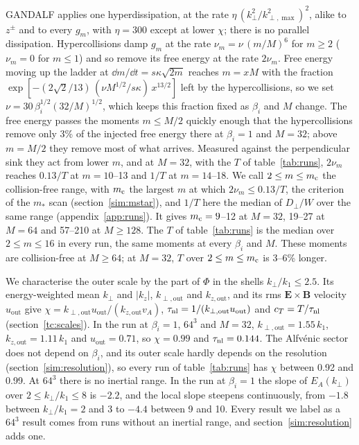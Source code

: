 GANDALF applies one hyperdissipation, at the rate $\eta\,(k_\perp^2/k_{\perp,\max}^2)^2$, alike to $z^\pm$ and to every $g_m$, with $\eta=300$ except at lower $\chi$; there is no parallel dissipation. Hypercollisions damp $g_m$ at the rate $\nu_m=\nu\,(m/M)^6$ for $m\ge2$ ($\nu_m=0$ for $m\le1$) and so remove its free energy at the rate $2\nu_m$. Free energy moving up the ladder at $\dd m/\dd t=s\kappa\sqrt{2m}$ reaches $m=xM$ with the fraction $\exp[-(2\sqrt2/13)\,(\nu M^{1/2}/s\kappa)\,x^{13/2}]$ left by the hypercollisions, so we set $\nu=30\,\beta_i^{1/2}(32/M)^{1/2}$, which keeps this fraction fixed as $\beta_i$ and $M$ change. The free energy passes the moments $m\le M/2$ quickly enough that the hypercollisions remove only 3\% of the injected free energy there at $\beta_i=1$ and $M=32$; above $m=M/2$ they remove most of what arrives. Measured against the perpendicular sink they act from lower $m$, and at $M=32$, with the $T$ of table~\ref{tab:runs}, $2\nu_m$ reaches $0.13/T$ at $m=10$--13 and $1/T$ at $m=14$--18. We call $2\le m\le m_{\rm c}$ the collision-free range, with $m_{\rm c}$ the largest $m$ at which $2\nu_m\le0.13/T$, the criterion of the $m_*$ scan (section~\ref{sim:mstar}), and $1/T$ here the median of $D_\perp/W$ over the same range (appendix~\ref{app:runs}). It gives $m_{\rm c}=9$--12 at $M=32$, 19--27 at $M=64$ and 57--210 at $M\ge128$. The $T$ of table~\ref{tab:runs} is the median over $2\le m\le16$ in every run, the same moments at every $\beta_i$ and $M$. These moments are collision-free at $M\ge64$; at $M=32$, $T$ over $2\le m\le m_{\rm c}$ is 3--6\% longer.

We characterise the outer scale by the part of $\Phi$ in the shells $k_\perp/k_1\le2.5$. Its energy-weighted mean $k_\perp$ and $|k_z|$, $k_{\perp,\mathrm{out}}$ and $k_{z,\mathrm{out}}$, and its rms $\boldsymbol E\times\boldsymbol B$ velocity $u_{\mathrm{out}}$ give $\chi=k_{\perp,\mathrm{out}}u_{\mathrm{out}}/(k_{z,\mathrm{out}}v_A)$, $\tau_{\rm nl}=1/(k_{\perp,\mathrm{out}}u_{\mathrm{out}})$ and $c_T=T/\tau_{\rm nl}$ (section~\ref{tc:scales}). In the run at $\beta_i=1$, $64^3$ and $M=32$, $k_{\perp,\mathrm{out}}=1.55\,k_1$, $k_{z,\mathrm{out}}=1.11\,k_1$ and $u_{\mathrm{out}}=0.71$, so $\chi=0.99$ and $\tau_{\rm nl}=0.144$. The Alfv\'enic sector does not depend on $\beta_i$, and its outer scale hardly depends on the resolution (section~\ref{sim:resolution}), so every run of table~\ref{tab:runs} has $\chi$ between 0.92 and 0.99. At $64^3$ there is no inertial range. In the run at $\beta_i=1$ the slope of $E_A(k_\perp)$ over $2\le k_\perp/k_1\le8$ is $-2.2$, and the local slope steepens continuously, from $-1.8$ between $k_\perp/k_1=2$ and 3 to $-4.4$ between 9 and 10. Every result we label as a $64^3$ result comes from runs without an inertial range, and section~\ref{sim:resolution} adds one.

